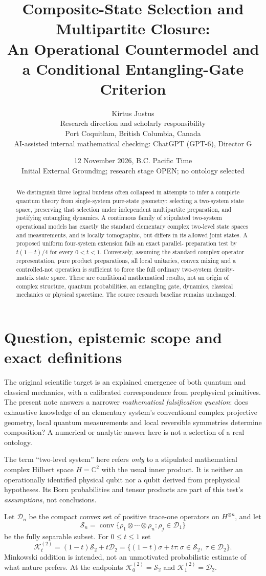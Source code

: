 \documentclass[11pt,letterpaper]{article}
\title{\textbf{Composite-State Selection and Multipartite Closure:}\\
An Operational Countermodel and a Conditional Entangling-Gate Criterion}
\author{Kirtus Justus\\\small Research direction and scholarly responsibility\\
\small Port Coquitlam, British Columbia, Canada\\[4pt]
\small AI-assisted internal mathematical checking: ChatGPT (GPT-6), Director G}
\date{12 November 2026, B.C. Pacific Time\\[2pt]
\small Initial External Grounding; research stage OPEN; no ontology selected}
\newcommand{\D}{\mathcal{D}}
\newcommand{\Ssep}{\mathcal{S}}
\newcommand{\K}{\mathcal{K}}
\newcommand{\C}{\mathbb{C}}
\begin{document}
\maketitle
\begin{abstract}
We distinguish three logical burdens often collapsed in attempts to infer a complete
quantum theory from single-system pure-state geometry: selecting a two-system state
space, preserving that selection under independent multipartite preparation, and
justifying entangling dynamics. A continuous family of stipulated two-system
operational models has exactly the standard elementary complex two-level state
spaces and measurements, and is locally tomographic, but differs in its allowed
joint states. A proposed uniform four-system extension fails an exact parallel-
preparation test by $t(1-t)/4$ for every $0<t<1$. Conversely, assuming the standard
complex operator representation, pure product preparations, all local unitaries,
convex mixing and a controlled-not operation is sufficient to force the full
ordinary two-system density-matrix state space. These are conditional mathematical
results, not an origin of complex structure, quantum probabilities, an entangling
gate, dynamics, classical mechanics or physical spacetime. The source research
baseline remains unchanged.
\end{abstract}

\section{Question, epistemic scope and exact definitions}
The original scientific target is an explained emergence of both quantum and classical
mechanics, with a calibrated correspondence from prephysical primitives. The present
note answers a narrower \emph{mathematical falsification question}: does exhaustive
knowledge of an elementary system's conventional complex projective geometry,
local quantum measurements and local reversible symmetries determine composition?
A numerical or analytic answer here is not a selection of a real ontology.

The term ``two-level system'' here refers \emph{only} to a stipulated mathematical
complex Hilbert space $H=\C^2$ with the usual inner product. It is neither an
operationally identified physical qubit nor a qubit derived from prephysical
hypotheses. Its Born probabilities and tensor products are part of this test's
\emph{assumptions}, not conclusions.

Let $\D_n$ be the compact convex set of positive trace-one operators on
$H^{\otimes n}$, and let
\[
\Ssep_n = \operatorname{conv}\{\rho_1\otimes\cdots\otimes\rho_n:
\rho_j\in\D_1\}
\]
be the fully separable subset. For $0\leq t\leq 1$ set
\begin{equation}\label{eq:Kt}
\K_t^{(2)}=(1-t)\Ssep_2+t\D_2
=\{(1-t)\sigma+t\tau:\sigma\in\Ssep_2,\;\tau\in\D_2\}.
\end{equation}
Minkowski addition is intended, not an unmotivated probabilistic estimate of what
nature prefers. At the endpoints $\K_0^{(2)}=\Ssep_2$ and $\K_1^{(2)}=\D_2$.
\end{document}
